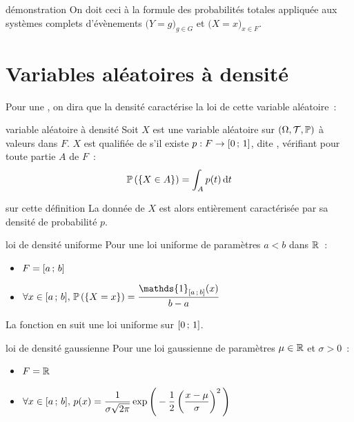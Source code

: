 \begin{remarque}{}{démonstration}
    On doit ceci à la formule des probabilités totales appliquée aux systèmes complets d'évènements $\Big( Y=g \Big)_{g \in G}$ et $\Big( X=x \Big)_{x \in F}$.
\end{remarque}

\section{Variables aléatoires à densité}

Pour une , on dira que la densité caractérise la loi de cette variable aléatoire~:

\begin{definition}{}{variable aléatoire à densité}
    Soit $X$ est une variable aléatoire sur $(\Omega, \mathcal{T}, \mathbb{P})$ à valeurs dans $F$.
    $X$ est qualifiée de  s'il existe $p : F \to [0\, ; \, 1]$, dite , vérifiant pour toute partie $A$ de $F$~:
    $$\mathbb{P}\left(\left\{X \in A\right\}\right) = \int_A p(t)\,\mathrm{d}t$$
\end{definition}

\begin{remarque}{}{sur cette définition}
    La donnée de $X$ est alors entièrement caractérisée par sa densité de probabilité $p$.
\end{remarque}

\begin{exemple}{}{loi de densité uniforme}
    Pour une loi uniforme de paramètres $a<b$ dans $\mathbb{R}$~:
    \begin{itemize}
        \item $\displaystyle F = [a\, ; \, b]$
        \item $\displaystyle \forall x \in \seg{a}{b},\, \probaset{X = x} = \frac{\mathds{1}_{\seg{a}{b}}(x)}{b-a}$
    \end{itemize}
    La fonction  en  suit une loi uniforme sur $[0\, ; \, 1]$.
\end{exemple}

\begin{exemple}{}{loi de densité gaussienne}
    Pour une loi gaussienne de paramètres $\mu \in \mathbb{R}$ et $\sigma > 0$~:
    \begin{itemize}
        \item $\displaystyle F = \mathbb{R}$
        \item $\displaystyle \forall x \in [a\, ; \, b],\, p(x) = \frac1{\sigma \sqrt{2\pi}}\operatorname \exp\Bigg(-\frac12\left(\frac{x-\mu}{\sigma}\right)^2\Bigg)$
    \end{itemize}
\end{exemple}


